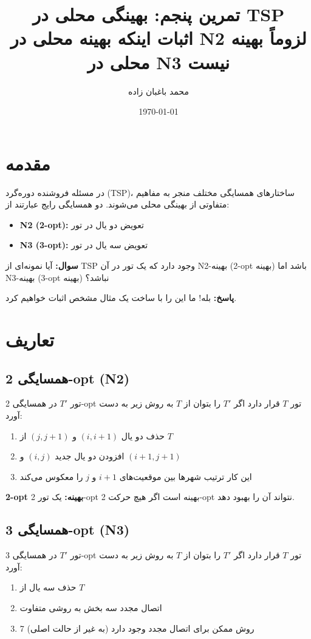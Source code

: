\documentclass[12pt,a4paper]{article}
\title{\textbf{تمرین پنجم: بهینگی محلی در TSP}\\
\large اثبات اینکه بهینه محلی در N2 لزوماً بهینه محلی در N3 نیست}
\author{محمد باغبان زاده}
\date{\today}
\begin{document}
\maketitle
\tableofcontents
\newpage

\section{مقدمه}

در مسئله فروشنده دوره‌گرد (TSP)، ساختارهای همسایگی مختلف منجر به مفاهیم متفاوتی از بهینگی محلی می‌شوند. دو همسایگی رایج عبارتند از:

\begin{itemize}
    \item \textbf{N2 (2-opt):} تعویض دو یال در تور
    \item \textbf{N3 (3-opt):} تعویض سه یال در تور
\end{itemize}

\textbf{سوال:} آیا نمونه‌ای از TSP وجود دارد که یک تور در آن N2-بهینه (2-opt بهینه) باشد اما N3-بهینه (3-opt بهینه) نباشد؟

\textbf{پاسخ:} بله! ما این را با ساخت یک مثال مشخص اثبات خواهیم کرد.

\section{تعاریف}

\subsection{همسایگی 2-opt (N2)}

تور $T'$ در همسایگی 2-opt تور $T$ قرار دارد اگر $T'$ را بتوان از $T$ به روش زیر به دست آورد:
\begin{enumerate}
    \item حذف دو یال $(i,i+1)$ و $(j,j+1)$ از $T$
    \item افزودن دو یال جدید $(i,j)$ و $(i+1,j+1)$
    \item این کار ترتیب شهرها بین موقعیت‌های $i+1$ و $j$ را معکوس می‌کند
\end{enumerate}

\textbf{2-opt بهینه:} یک تور 2-opt بهینه است اگر هیچ حرکت 2-opt نتواند آن را بهبود دهد.

\subsection{همسایگی 3-opt (N3)}

تور $T'$ در همسایگی 3-opt تور $T$ قرار دارد اگر $T'$ را بتوان از $T$ به روش زیر به دست آورد:
\begin{enumerate}
    \item حذف سه یال از $T$
    \item اتصال مجدد سه بخش به روشی متفاوت
    \item 7 روش ممکن برای اتصال مجدد وجود دارد (به غیر از حالت اصلی)
\end{enumerate}
\end{document}
